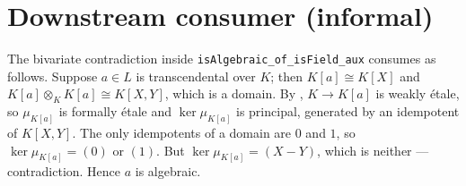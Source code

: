 \section{Downstream consumer (informal)}

The bivariate contradiction inside
\texttt{isAlgebraic\_of\_isField\_aux} consumes
 as follows. Suppose $a \in L$
is transcendental over $K$; then $K[a] \cong K[X]$ and
$K[a] \otimes_K K[a] \cong K[X, Y]$, which is a domain. By
, $K \to K[a]$ is weakly étale,
so $\mu_{K[a]}$ is formally étale and $\ker \mu_{K[a]}$ is principal,
generated by an idempotent of $K[X, Y]$. The only idempotents of a
domain are $0$ and $1$, so $\ker \mu_{K[a]} = (0)$ or $(1)$. But
$\ker \mu_{K[a]} = (X - Y)$, which is neither — contradiction. Hence
$a$ is algebraic.
